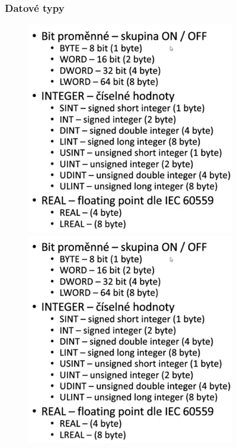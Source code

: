 \begin{figure}[h]
\subsubsection*{Datové typy}
\begin{figure}[!h]
  \includegraphics[scale = 0.85]{img/Picture16.png}
    \includegraphics[scale = 0.85]{img/Picture16.png}
\end{figure}


\end{figure}
